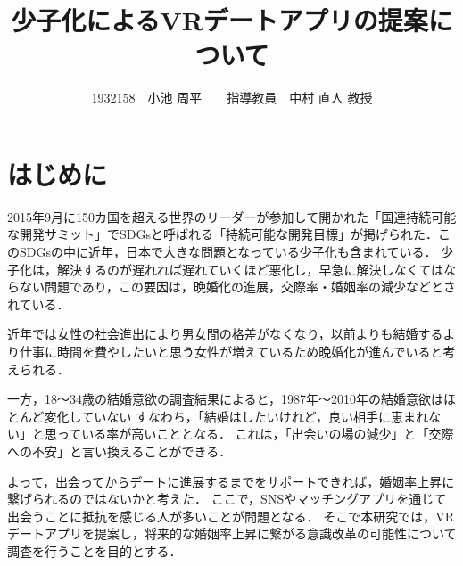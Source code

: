 \documentclass[12pt]{ltjsarticle}
\title{少子化によるVRデートアプリの提案について}
\author{1932158　小池 周平　　指導教員　中村 直人 教授}
\begin{document}
\maketitle

\section{はじめに}



2015年9月に150カ国を超える世界のリーダーが参加して開かれた「国連持続可能な開発サミット」でSDGsと呼ばれる「持続可能な開発目標」が掲げられた．このSDGsの中に近年，日本で大きな問題となっている少子化も含まれている．
少子化は，解決するのが遅れれば遅れていくほど悪化し，早急に解決しなくてはならない問題であり，この要因は，晩婚化の進展，交際率・婚姻率の減少などとされている．


近年では女性の社会進出により男女間の格差がなくなり，以前よりも結婚するより仕事に時間を費やしたいと思う女性が増えているため晩婚化が進んでいると考えられる\cite{sasaki2012}．

一方，18〜34歳の結婚意欲の調査結果によると，1987年〜2010年の結婚意欲はほとんど変化していない
すなわち，「結婚はしたいけれど，良い相手に恵まれない」と思っている率が高いこととなる\cite{naikakufu2019}．
これは，「出会いの場の減少」と「交際への不安」と言い換えることができる．

よって，出会ってからデートに進展するまでをサポートできれば，婚姻率上昇に繋げられるのではないかと考えた．
ここで，SNSやマッチングアプリを通じて出会うことに抵抗を感じる人が多いことが問題となる．
そこで本研究では，VRデートアプリを提案し，将来的な婚姻率上昇に繋がる意識改革の可能性について調査を行うことを目的とする．
\end{document}
